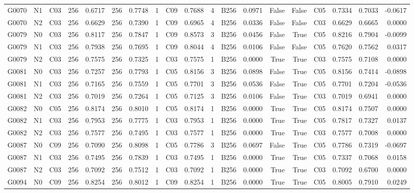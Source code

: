 \begin{tabular}{lllrrrrrlrrlrrrlrrr}
G0070 & N1 & C03 & 256 & 0.6717 & 256 & 0.7748 & 1 & C09 & 0.7688 & 4 & B256 & 0.0971 & False & False & C05 & 0.7334 & 0.7033 & -0.0617 \\
G0070 & N2 & C03 & 256 & 0.6629 & 256 & 0.7390 & 1 & C09 & 0.6965 & 4 & B256 & 0.0336 & False & False & C03 & 0.6629 & 0.6665 & 0.0000 \\
G0079 & N0 & C03 & 256 & 0.8117 & 256 & 0.7847 & 1 & C09 & 0.8573 & 3 & B256 & 0.0456 & False & True & C05 & 0.8216 & 0.7904 & -0.0099 \\
G0079 & N1 & C03 & 256 & 0.7938 & 256 & 0.7695 & 1 & C09 & 0.8044 & 4 & B256 & 0.0106 & False & False & C05 & 0.7620 & 0.7562 & 0.0317 \\
G0079 & N2 & C03 & 256 & 0.7575 & 256 & 0.7325 & 1 & C03 & 0.7575 & 1 & B256 & 0.0000 & True & True & C03 & 0.7575 & 0.7108 & 0.0000 \\
G0081 & N0 & C03 & 256 & 0.7257 & 256 & 0.7793 & 1 & C05 & 0.8156 & 3 & B256 & 0.0898 & False & True & C05 & 0.8156 & 0.7414 & -0.0898 \\
G0081 & N1 & C03 & 256 & 0.7165 & 256 & 0.7559 & 1 & C05 & 0.7701 & 3 & B256 & 0.0536 & False & True & C05 & 0.7701 & 0.7204 & -0.0536 \\
G0081 & N2 & C03 & 256 & 0.7019 & 256 & 0.7264 & 1 & C05 & 0.7125 & 3 & B256 & 0.0106 & False & True & C03 & 0.7019 & 0.6941 & 0.0000 \\
G0082 & N0 & C05 & 256 & 0.8174 & 256 & 0.8010 & 1 & C05 & 0.8174 & 1 & B256 & 0.0000 & True & True & C05 & 0.8174 & 0.7507 & 0.0000 \\
G0082 & N1 & C03 & 256 & 0.7953 & 256 & 0.7775 & 1 & C03 & 0.7953 & 1 & B256 & 0.0000 & True & True & C05 & 0.7817 & 0.7327 & 0.0137 \\
G0082 & N2 & C03 & 256 & 0.7577 & 256 & 0.7495 & 1 & C03 & 0.7577 & 1 & B256 & 0.0000 & True & True & C03 & 0.7577 & 0.7008 & 0.0000 \\
G0087 & N0 & C09 & 256 & 0.7090 & 256 & 0.8098 & 1 & C05 & 0.7786 & 3 & B256 & 0.0697 & False & True & C05 & 0.7786 & 0.7319 & -0.0697 \\
G0087 & N1 & C03 & 256 & 0.7495 & 256 & 0.7839 & 1 & C03 & 0.7495 & 1 & B256 & 0.0000 & True & True & C05 & 0.7337 & 0.7068 & 0.0158 \\
G0087 & N2 & C03 & 256 & 0.7092 & 256 & 0.7512 & 1 & C03 & 0.7092 & 1 & B256 & 0.0000 & True & True & C03 & 0.7092 & 0.6700 & 0.0000 \\
G0094 & N0 & C09 & 256 & 0.8254 & 256 & 0.8012 & 1 & C09 & 0.8254 & 1 & B256 & 0.0000 & True & True & C05 & 0.8005 & 0.7910 & 0.0249 \\

\end{tabular}
